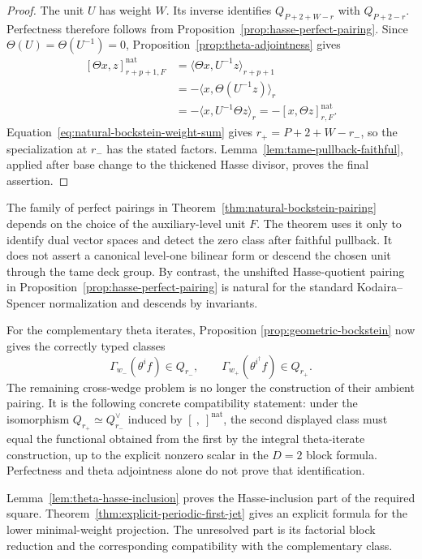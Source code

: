 \begin{proof}
The unit $U$ has weight $W$.  Its inverse identifies
$Q_{P+2+W-r}$ with $Q_{P+2-r}$.  Perfectness therefore follows from
Proposition~\ref{prop:hasse-perfect-pairing}.  Since
$\Theta(U)=\Theta(U^{-1})=0$, Proposition~\ref{prop:theta-adjointness}
gives
\[
 \begin{aligned}
 [\Theta x,z]^{\mathrm{nat}}_{r+p+1,F}
 &=\langle\Theta x,U^{-1}z\rangle_{r+p+1}\\
 &=-\langle x,\Theta(U^{-1}z)\rangle_r\\
 &=-\langle x,U^{-1}\Theta z\rangle_r
 =-[x,\Theta z]^{\mathrm{nat}}_{r,F}.
 \end{aligned}
\]
Equation~\eqref{eq:natural-bockstein-weight-sum} gives
$r_+=P+2+W-r_-$, so the specialization at $r_-$ has the stated factors.
Lemma~\ref{lem:tame-pullback-faithful}, applied after base change to the
thickened Hasse divisor, proves the final assertion.
\end{proof}

\begin{remark}
The family of perfect pairings in
Theorem~\ref{thm:natural-bockstein-pairing} depends on the choice of the
auxiliary-level unit $F$.  The theorem uses it only to identify dual vector
spaces and detect the zero class after faithful pullback.  It does not
assert a canonical level-one bilinear form or descend the chosen unit
through the tame deck group.  By contrast, the unshifted Hasse-quotient
pairing in Proposition~\ref{prop:hasse-perfect-pairing} is natural for the
standard Kodaira--Spencer normalization and descends by invariants.
\end{remark}

For the complementary theta iterates, Proposition
\ref{prop:geometric-bockstein} now gives the correctly typed classes
\[
 \Gamma_{w_-}(\theta^if)\in Q_{r_-},
 \qquad
 \Gamma_{w_+}(\theta^{i^\dagger}f)\in Q_{r_+}.
\]
The remaining cross-wedge problem is no longer the construction of their
ambient pairing.  It is the following concrete compatibility statement:
under the isomorphism $Q_{r_+}\simeq Q_{r_-}^\vee$ induced by
$[\ ,\ ]^{\mathrm{nat}}$, the second displayed class must equal the
functional obtained from the first by the integral theta-iterate
construction, up to the explicit nonzero scalar in the $D=2$ block
formula.  Perfectness and theta adjointness alone do not prove that
identification.

Lemma~\ref{lem:theta-hasse-inclusion} proves the Hasse-inclusion part of
the required square.  Theorem~\ref{thm:explicit-periodic-first-jet} gives
an explicit formula for the lower minimal-weight projection.  The
unresolved part is its factorial block reduction and the corresponding
compatibility with the complementary class.
